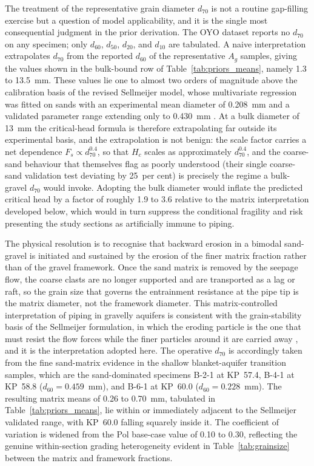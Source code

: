 The treatment of the representative grain diameter $d_{70}$ is not a routine gap-filling exercise but a question of model applicability, and it is the single most consequential judgment in the prior derivation. The OYO dataset reports no $d_{70}$ on any specimen; only $d_{60}$, $d_{50}$, $d_{20}$, and $d_{10}$ are tabulated. A naive interpretation extrapolates $d_{70}$ from the reported $d_{60}$ of the representative $A_g$ samples, giving the values shown in the bulk-bound row of Table~\ref{tab:priors_means}, namely 1.3 to 13.5~mm. These values lie one to almost two orders of magnitude above the calibration basis of the revised Sellmeijer model, whose multivariate regression was fitted on sands with an experimental mean diameter of 0.208~mm and a validated parameter range extending only to 0.430~mm \parencite{sellmeijer_2011}. At a bulk diameter of 13~mm the critical-head formula is therefore extrapolating far outside its experimental basis, and the extrapolation is not benign: the scale factor carries a net dependence $F_s \propto d_{70}^{0.4}$, so that $H_c$ scales as approximately $d_{70}^{0.4}$, and the coarse-sand behaviour that \textcite{sellmeijer_2011} themselves flag as poorly understood (their single coarse-sand validation test deviating by 25~per cent) is precisely the regime a bulk-gravel $d_{70}$ would invoke. Adopting the bulk diameter would inflate the predicted critical head by a factor of roughly 1.9 to 3.6 relative to the matrix interpretation developed below, which would in turn suppress the conditional fragility and risk presenting the study sections as artificially immune to piping.

The physical resolution is to recognise that backward erosion in a bimodal sand-gravel is initiated and sustained by the erosion of the finer matrix fraction rather than of the gravel framework. Once the sand matrix is removed by the seepage flow, the coarse clasts are no longer supported and are transported as a lag or raft, so the grain size that governs the entrainment resistance at the pipe tip is the matrix diameter, not the framework diameter. This matrix-controlled interpretation of piping in gravelly aquifers is consistent with the grain-stability basis of the Sellmeijer formulation, in which the eroding particle is the one that must resist the flow forces while the finer particles around it are carried away \parencite{sellmeijer_2011}, and it is the interpretation adopted here. The operative $d_{70}$ is accordingly taken from the fine sand-matrix evidence in the shallow blanket-aquifer transition samples, which are the sand-dominated specimens B-2-1 at KP~57.4, B-4-1 at KP~58.8 ($d_{60} = 0.459$~mm), and B-6-1 at KP~60.0 ($d_{60} = 0.228$~mm). The resulting matrix means of 0.26 to 0.70~mm, tabulated in Table~\ref{tab:priors_means}, lie within or immediately adjacent to the Sellmeijer validated range, with KP~60.0 falling squarely inside it. The coefficient of variation is widened from the Pol base-case value of 0.10 to 0.30, reflecting the genuine within-section grading heterogeneity evident in Table~\ref{tab:grainsize} between the matrix and framework fractions.

